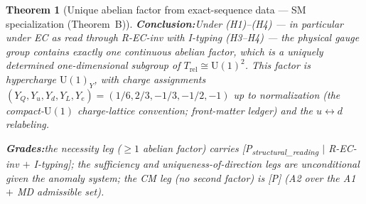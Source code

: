 \documentclass[11pt]{article}
\newtheorem{theorem}{Theorem}[section]
\theoremstyle{definition}
\newcommand{\U}{\mathrm{U}}
\begin{document}
\begin{theorem}[Unique abelian factor from exact-sequence data ---
SM specialization (Theorem~B)]
\smallskip\noindent\textbf{Conclusion:}\quad Under (H1)--(H4) --- in
particular under EC as read through R-EC-inv with I-typing (H3--H4)
--- the physical gauge group
contains exactly one continuous abelian factor, which is a uniquely
determined one-dimensional subgroup of $T_{\mathrm{rel}} \cong
\mathrm{U}(1)^2$.  This factor is hypercharge $\U(1)_Y$, with charge
assignments $(Y_Q, Y_u, Y_d, Y_L, Y_e) =
(1/6, 2/3, -1/3, -1/2, -1)$ up to normalization (the compact-$\U(1)$
charge-lattice convention; front-matter ledger) and the
$u \leftrightarrow d$ relabeling.

\smallskip\noindent\textbf{Grades:}\quad the necessity leg ($\ge 1$
abelian factor) carries
[P\textsubscript{structural\_reading} $\mid$ R-EC-inv $+$ I-typing];
the sufficiency and uniqueness-of-direction legs are unconditional
given the anomaly system; the CM leg (no second factor) is [P]
(A2 over the A1 $+$ MD admissible set).
\end{theorem}
\end{document}

